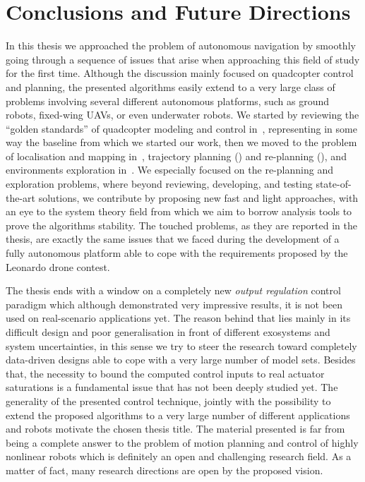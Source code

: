 \chapter*{Conclusions and Future Directions}%
\label{CH:CONCLUSIONS}

In this thesis we approached the problem of autonomous navigation by smoothly going through a sequence of issues
that arise when approaching this field of study for the first time.
Although the discussion mainly focused on quadcopter control and planning, the presented algorithms
easily extend to a very large class of problems involving several different autonomous platforms, such as
ground robots, fixed-wing UAVs, or even underwater robots.
We started by reviewing the ``golden standards'' of quadcopter modeling and control in~,
representing in some way the baseline from which we started our work, then we moved to the problem of localisation and
mapping in~, trajectory planning () and re-planning (),
and environments exploration in~.
We especially focused on the re-planning and exploration problems, where beyond reviewing, developing, and testing
state-of-the-art solutions, we contribute by proposing new fast and light approaches, with an eye to the
system theory field from which we aim to borrow analysis tools to prove the algorithms stability.
The touched problems, as they are reported in the thesis, are exactly the same issues that we faced during the
development of a fully autonomous platform able to cope with the requirements proposed by the Leonardo drone contest.

The thesis ends with a window on a completely new \emph{output regulation} control paradigm which although demonstrated
very impressive results, it is not been used on real-scenario applications yet.
The reason behind that lies mainly in its difficult design and poor generalisation in front of different
exosystems and system uncertainties, in this sense we try to steer the research toward completely data-driven
designs able to cope with a very large number of model sets.
Besides that, the necessity to bound the computed control inputs to real actuator saturations is a fundamental
issue that has not been deeply studied yet.
The generality of the presented control technique, jointly with the possibility to extend the proposed algorithms to
a very large number of different applications and robots motivate the chosen thesis title.
The material presented is far from being a complete answer to the problem of motion planning and control of highly nonlinear
robots which is definitely an open and challenging research field.
As a matter of fact, many research directions are open by the proposed vision.

